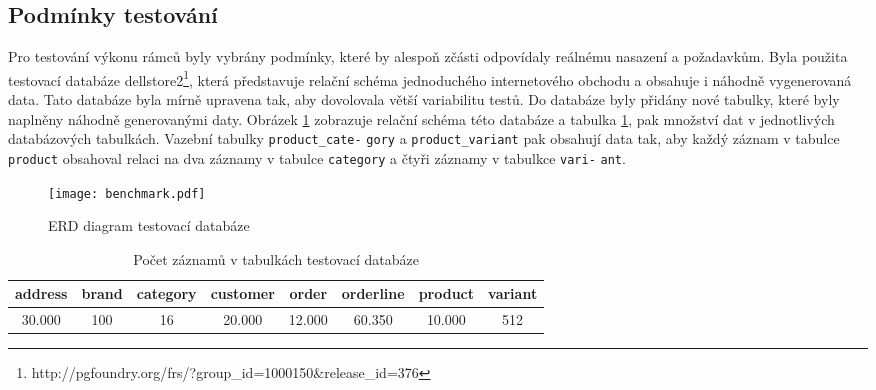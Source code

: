 \documentclass[ing,male,java,dept456]{diploma}						%
\begin{document}
\subsection{Podmínky testování}
Pro testování výkonu rámců byly vybrány podmínky, které by alespoň zčásti odpovídaly reálnému nasazení a požadavkům. 
Byla použita testovací databáze dellstore2\footnote{http://pgfoundry.org/frs/?group\_id=1000150\&release\_id=376}, která představuje relační schéma jednoduchého internetového obchodu a obsahuje i náhodně vygenerovaná data. Tato databáze byla mírně upravena tak, aby dovolovala větší variabilitu testů. Do databáze byly přidány nové tabulky, které byly naplněny náhodně generovanými daty. Obrázek \ref{fig:Testdb} zobrazuje relační schéma této databáze a tabulka \ref{tab:TestRecords}, pak množství dat v jednotlivých databázových tabulkách. Vazební tabulky \lstinline[style=inlinepython]|product_cate-| \lstinline[style=inlinepython]|gory| a \lstinline[style=inlinepython]|product_variant| pak obsahují data tak, aby každý záznam v tabulce \lstinline[style=inlinepython]|product| obsahoval relaci na dva záznamy v tabulce \lstinline[style=inlinepython]|category| a čtyři záznamy v tabulkce \lstinline[style=inlinepython]|vari-| \lstinline[style=inlinepython]|ant|.

\begin{figure}
    \centering
    \texttt{[image: benchmark.pdf]}
    \caption{ERD diagram testovací databáze}
    \label{fig:Testdb}
\end{figure}

\begin{table}
  \centering
  \begin{tabular}{|c|c|c|c|c|c|c|c|}
    \hline
    address & brand & category & customer & order & orderline & product & variant \\
    \hline
	30.000 & 100 & 16 & 20.000 & 12.000 & 60.350 & 10.000 &  512 \\
	\hline
  \end{tabular}
  \caption{Počet záznamů v tabulkách testovací databáze}
  \label{tab:TestRecords}
\end{table}
\end{document}
